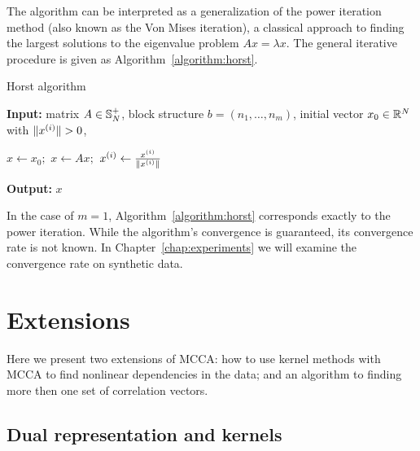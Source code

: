 The algorithm can be interpreted as a generalization of the power
iteration method (also known as the Von Mises iteration), a classical
approach to finding the largest solutions to the eigenvalue problem 
$A x = \lambda x$.  The general iterative procedure is given 
as Algorithm~\ref{algorithm:horst}.
\begin{algorithm}
\caption{Horst algorithm}
\label{algorithm:horst}
{\bf Input:} matrix $A \in \mathbb{S}_N^+$, block structure $b = \left(n_1,\ldots,n_m\right)$, 
initial vector $x_0 \in \mathbb{R}^N$ with $\lVert x^{(i)}\rVert > 0$,  \par
\begin{algorithmic}
\STATE $x \leftarrow x_0;$
\STATE $x \leftarrow A x;$
\STATE $x^{(i)} \leftarrow \frac{x^{(i)}}{\lVert x^{(i)}\rVert}$
\ENDFOR
\ENDFOR
\end{algorithmic}
{\bf Output:} $x$
\end{algorithm}

In the case of $m=1$,  Algorithm~\ref{algorithm:horst}
corresponds exactly to the power iteration. While the algorithm's
convergence is guaranteed, its convergence rate is not known. In
Chapter~\ref{chap:experiments} we will examine the convergence
rate on synthetic data.

\section{Extensions}

Here we present two extensions of MCCA: how to use kernel methods with
MCCA to find nonlinear dependencies in the data; and an
algorithm to finding more then one set of correlation vectors.
\subsection{Dual representation and kernels}\label{chap:extensions:kernels}

